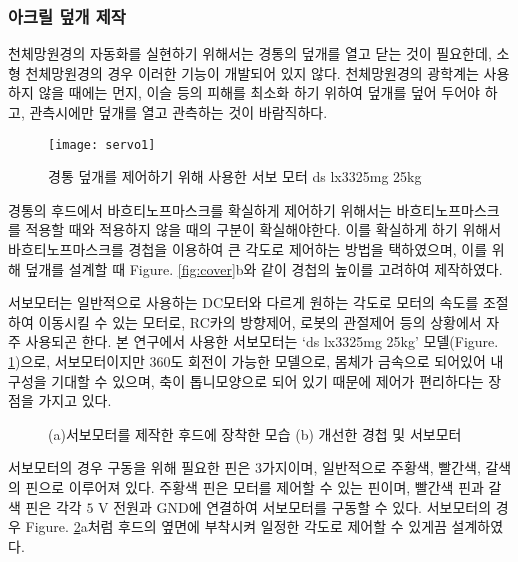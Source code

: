 \subsubsection{아크릴 덮개 제작}

천체망원경의 자동화를 실현하기 위해서는 경통의 덮개를 열고 닫는 것이 필요한데, 소형 천체망원경의 경우 이러한 기능이 개발되어 있지 않다. 천체망원경의 광학계는 사용하지 않을 때에는 먼지, 이슬 등의 피해를 최소화 하기 위하여 덮개를 덮어 두어야 하고, 관측시에만 덮개를 열고 관측하는 것이 바람직하다. 
\begin{figure}[h]
	\begin{center}
		\texttt{[image: servo1]}
	\end{center}
	\caption{경통 덮개를 제어하기 위해 사용한 서보 모터 ds lx3325mg 25kg}
	\label{motor}
\end{figure}


경통의 후드에서 바흐티노프마스크를 확실하게 제어하기 위해서는 바흐티노프마스크를 적용할 때와 적용하지 않을 때의 구분이 확실해야한다. 이를 확실하게 하기 위해서 바흐티노프마스크를 경첩을 이용하여 큰 각도로 제어하는 방법을 택하였으며, 이를 위해 덮개를 설계할 때 \textrm{Figure}. \ref{fig:cover}b와 같이 경첩의 높이를 고려하여 제작하였다.

서보모터는 일반적으로 사용하는 DC모터와 다르게 원하는 각도로 모터의 속도를 조절하여 이동시킬 수 있는 모터로,  RC카의 방향제어, 로봇의 관절제어 등의 상황에서 자주 사용되곤 한다. 본 연구에서 사용한 서보모터는 ‘ds lx3325mg 25kg’ 모델(\textrm{Figure}. \ref{motor})으로, 서보모터이지만 360도 회전이 가능한 모델으로, 몸체가 금속으로 되어있어 내구성을 기대할 수 있으며, 축이 톱니모양으로 되어 있기 때문에 제어가 편리하다는 장점을 가지고 있다.



\begin{figure}[ht]
	\begin{center}
	\end{center}
	\caption{(a)서보모터를 제작한 후드에 장착한 모습 (b) 개선한 경첩 및 서보모터}
	\label{servohinge}
\end{figure}

서보모터의 경우 구동을 위해 필요한 핀은 3가지이며, 일반적으로 주황색, 빨간색, 갈색의 핀으로 이루어져 있다. 주황색 핀은 모터를 제어할 수 있는 핀이며, 빨간색 핀과 갈색 핀은 각각 $5\textrm{ V}$ 전원과 GND에 연결하여 서보모터를 구동할 수 있다. 서보모터의 경우 \textrm{Figure}. \ref{servohinge}a처럼 후드의 옆면에 부착시켜 일정한 각도로 제어할 수 있게끔 설계하였다.

